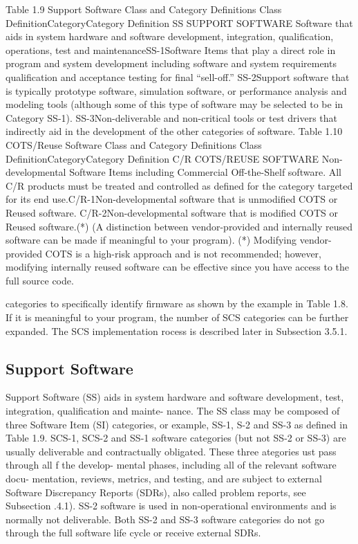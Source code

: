 \documentclass{book}
\begin{document}
\begin{multicols}{2}
Table 1.9 Support Software Class and Category Definitions
Class DefinitionCategoryCategory Definition
SS
SUPPORT SOFTWARE
Software that aids in system hardware and
software development, integration,
qualification, operations, test and maintenanceSS-1Software Items that play a direct role in program and
system development including software and system
requirements qualification and acceptance testing for
final “sell-off.”
SS-2Support software that is typically prototype software,
simulation software, or performance analysis and
modeling tools (although some of this type of
software may be selected to be in Category SS-1).
SS-3Non-deliverable and non-critical tools or test drivers
that indirectly aid in the development of the other
categories of software.
Table 1.10 COTS/Reuse Software Class and Category Definitions
Class DefinitionCategoryCategory Definition
C/R
COTS/REUSE SOFTWARE
Non-developmental Software Items including Commercial
Off-the-Shelf software.
All C/R products must be treated and controlled as defined
for the category targeted for its end use.C/R-1Non-developmental software that is
unmodified COTS or Reused software.
C/R-2Non-developmental software that is
modified COTS or Reused software.(*) (A
distinction between vendor-provided and
internally reused software can be made if
meaningful to your program).
(*) Modifying vendor-provided COTS is a high-risk approach and is not recommended; however, modifying internally
reused software can be effective since you have access to the full source code.


categories to specifically identify firmware as shown by the
example in Table 1.8. If it is meaningful to your program,
the number of SCS categories can be further expanded. The
SCS implementation rocess is described later in Subsection
3.5.1.

\subsection{Support Software}
Support Software (SS) aids in system hardware and software
development, test, integration, qualification and mainte-
nance. The SS class may be composed of three Software Item
(SI) categories, or example, SS-1, S-2 and SS-3 as defined
in Table 1.9.
SCS-1, SCS-2 and SS-1 software categories (but not SS-2
or SS-3) are usually deliverable and contractually obligated.
These three ategories ust pass through all f the develop-
mental phases, including all of the relevant software docu-
mentation, reviews, metrics, and testing, and are subject to
external Software Discrepancy Reports (SDRs), also called
problem reports, see Subsection .4.1).
SS-2 software is used in non-operational environments
and is normally not deliverable. Both SS-2 and SS-3 software
categories do not go through the full software life cycle or
receive external SDRs.


\end{multicols}
\end{document}
